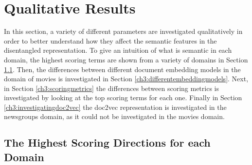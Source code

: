 




\section{Qualitative Results}\label{ch3:qualitative}

In this section, a variety of different parameters are investigated qualitatively in order to better understand how they affect the semantic features in the disentangled representation. To give an intuition of what is semantic in each domain,  the highest scoring terms are shown from a variety of domains in Section \ref{ch3:highestscoringterms}. Then, the differences between different document embedding models in the domain of movies is investigated in Section \ref{ch3:differentembeddingmodels}. Next, in Section \ref{ch3:scoringmetrics}  the differences between scoring metrics is investigated by looking at the top scoring terms for each one. Finally in Section \ref{ch3:investigatingdoc2vec} the doc2vec representation is investigated in the newsgroups domain, as it could not be investigated in the movies domain.



\subsection{The Highest Scoring Directions for each Domain}\label{ch3:highestscoringterms}

